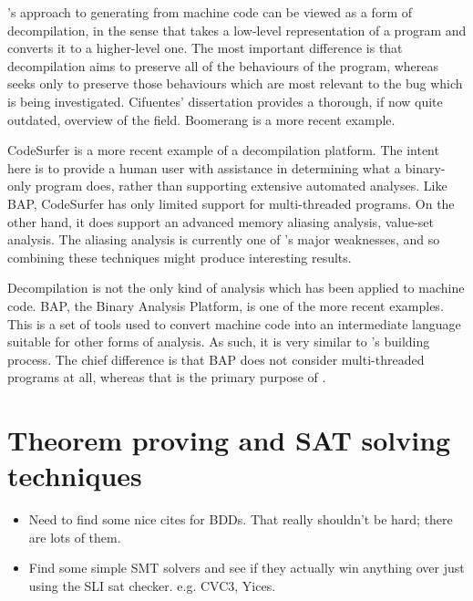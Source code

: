 {\Technique}'s approach to generating {\StateMachines} from machine
code can be viewed as a form of decompilation, in the sense that takes
a low-level representation of a program and converts it to a
higher-level one.  The most important difference is that decompilation
aims to preserve all of the behaviours of the program, whereas
{\technique} seeks only to preserve those behaviours which are most
relevant to the bug which is being investigated.  Cifuentes'
dissertation\cite{Cifuentes1994} provides a thorough, if now quite
outdated, overview of the field.  Boomerang\cite{Emmerik2004} is a
more recent example.

CodeSurfer\cite{Balakrishnan2005a} is a more recent example of a
decompilation platform.  The intent here is to provide a human user
with assistance in determining what a binary-only program does, rather
than supporting extensive automated analyses.  Like BAP, CodeSurfer
has only limited support for multi-threaded programs.  On the other
hand, it does support an advanced memory aliasing analysis, value-set
analysis\cite{Balakrishnan2004}.  The aliasing analysis is currently
one of {\technique}'s major weaknesses, and so combining these
techniques might produce interesting results.  

Decompilation is not the only kind of analysis which has been applied
to machine code.  BAP, the Binary Analysis Platform\cite{Brumley2011},
is one of the more recent examples.  This is a set of tools used to
convert machine code into an intermediate language suitable for other
forms of analysis.  As such, it is very similar to {\technique}'s
{\StateMachine} building process.  The chief difference is that BAP
does not consider multi-threaded programs at all, whereas that is the
primary purpose of {\StateMachine}.



\section{Theorem proving and SAT solving techniques}

\begin{itemize}
\item
  Need to find some nice cites for BDDs.  That really shouldn't be
  hard; there are lots of them.
\item
  Find some simple SMT solvers and see if they actually win anything over just using the SLI sat checker.
  e.g. CVC3, Yices.
\end{itemize}
